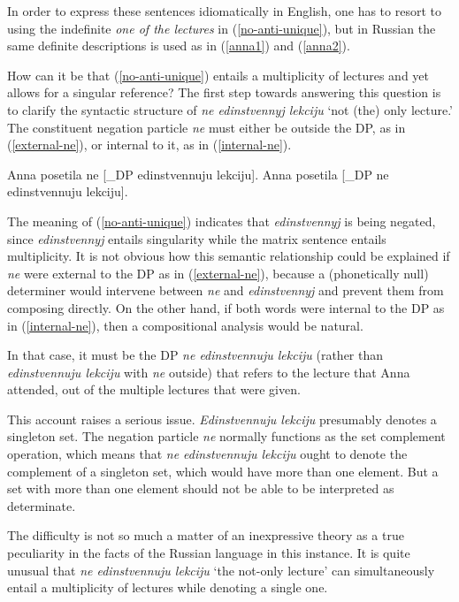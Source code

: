 In order to express these sentences idiomatically in English, one has to resort to using the indefinite \textit{one of the lectures} in (\ref{no-anti-unique}), but in Russian the same definite descriptions is used as in (\ref{anna1}) and (\ref{anna2}).

How can it be that (\ref{no-anti-unique}) entails a multiplicity of lectures and yet allows for a singular reference? The first step towards answering this question is to clarify the syntactic structure of \textit{ne edinstvennyj lekciju} `not (the) only lecture.' The constituent negation particle \textit{ne} must either be outside the DP, as in (\ref{external-ne}), or internal to it, as in (\ref{internal-ne}).

\begin{exe}
	\ex \label{external-ne} Anna posetila ne [_{DP} edinstvennuju lekciju].
	\ex \label{internal-ne} Anna posetila [_{DP} ne edinstvennuju lekciju].
\end{exe}

The meaning of (\ref{no-anti-unique}) indicates that \textit{edinstvennyj} is being negated, since \textit{edinstvennyj} entails singularity while the matrix sentence entails multiplicity. It is not obvious how this semantic relationship could be explained if \textit{ne} were external to the DP as in (\ref{external-ne}), because a (phonetically null) determiner would intervene between \textit{ne} and \textit{edinstvennyj} and prevent them from composing directly. On the other hand, if both words were internal to the DP as in (\ref{internal-ne}), then a compositional analysis would be natural.

In that case, it must be the DP \textit{ne edinstvennuju lekciju} (rather than \textit{edinstvennuju lekciju} with \textit{ne} outside) that refers to the lecture that Anna attended, out of the multiple lectures that were given.

This account raises a serious issue. \textit{Edinstvennuju lekciju} presumably denotes a singleton set. The negation particle \textit{ne} normally functions as the set complement operation, which means that \textit{ne edinstvennuju lekciju} ought to denote the complement of a singleton set, which would have more than one element. But a set with more than one element should not be able to be interpreted as determinate.

The difficulty is not so much a matter of an inexpressive theory as a true peculiarity in the facts of the Russian language in this instance. It is quite unusual that \textit{ne edinstvennuju lekciju} `the not-only lecture' can simultaneously entail a multiplicity of lectures while denoting a single one.

